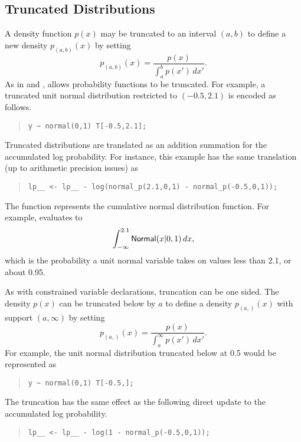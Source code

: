 \subsection{Truncated Distributions}

A density function $p(x)$ may be truncated to an interval $(a,b)$ to
define a new density $p_{(a,b)}(x)$ by setting
%
\[ 
p_{\!(a,b)\!}(x) = \frac{p(x)}
                  {\int_a^b p(x') \, dx'}.
\] 
As in \BUGS and \JAGS, \Stan allows probability functions to be
truncated.  For example, a truncated unit normal distribution
restricted to $(-0.5,2.1)$ is encoded as follows.
%
\begin{quote}
\begin{Verbatim} 
y ~ normal(0,1) T[-0.5,2.1];
\end{Verbatim}
\end{quote}
% 
Truncated distributions are translated as an addition summation for
the accumulated log probability.  For instance, this example has the
same translation (up to arithmetic precision issues) as
%
\begin{quote}
\begin{Verbatim}
lp__ <- lp__ - log(normal_p(2.1,0,1) - normal_p(-0.5,0,1));
\end{Verbatim}
\end{quote}
%
The function  represents the cumulative normal
distribution function.  For example,  evaluates to 
\[
\int_{-\infty}^{2.1} \mbox{\sf Normal}(x|0,1) \, dx,
\]
%
which is the probability a unit normal variable takes on values less
than 2.1, or about 0.95.

As with constrained variable declarations, truncation can be one
sided.  The density $p(x)$ can be truncated below by $a$ to define a
density $p_{(a,)}(x)$ with support $(a,\infty)$ by setting
%
\[
p_{(a,)}(x) = \frac{p(x)}
                 {\int_a^{\infty} p(x') \, dx'}.
\]
For example, the unit normal distribution truncated below at 0.5 would
be represented as
%
\begin{quote}
\begin{Verbatim} 
y ~ normal(0,1) T[-0.5,];
\end{Verbatim}
\end{quote}
% 
The truncation has the same effect as the following direct update to
the accumulated log probability.
%
\begin{quote}
\begin{Verbatim}
lp__ <- lp__ - log(1 - normal_p(-0.5,0,1));
\end{Verbatim}
\end{quote}

